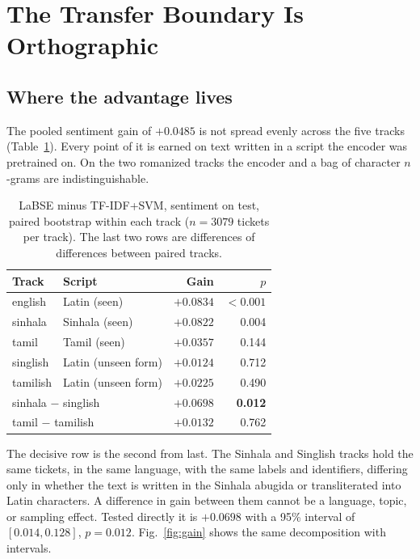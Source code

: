 \section{The Transfer Boundary Is Orthographic}
\label{sec:script}

\subsection{Where the advantage lives}

The pooled sentiment gain of $+0.0485$ is not spread evenly across the five
tracks (Table~\ref{tab:gain}). Every point of it is earned on text written in a
script the encoder was pretrained on. On the two romanized tracks the encoder
and a bag of character $n$-grams are indistinguishable.

\begin{table}[t]
\caption{LaBSE minus TF-IDF+SVM, sentiment \negf{} on test, paired bootstrap
within each track ($n=3079$ tickets per track). The last two rows are
differences of differences between paired tracks.}
\label{tab:gain}
\centering
\small
\begin{tabular}{llrr}
\toprule
Track & Script & Gain & $p$ \\
\midrule
english  & Latin (seen)         & $+0.0834$ & $<0.001$ \\
sinhala  & Sinhala (seen)       & $+0.0822$ & 0.004 \\
tamil    & Tamil (seen)         & $+0.0357$ & 0.144 \\
singlish & Latin (unseen form)  & $+0.0124$ & 0.712 \\
tamilish & Latin (unseen form)  & $+0.0225$ & 0.490 \\
\midrule
\multicolumn{2}{l}{sinhala $-$ singlish} & $\mathbf{+0.0698}$ & \textbf{0.012} \\
\multicolumn{2}{l}{tamil $-$ tamilish}   & $+0.0132$ & 0.762 \\
\bottomrule
\end{tabular}
\end{table}

The decisive row is the second from last. The Sinhala and Singlish tracks hold
the same tickets, in the same language, with the same labels and identifiers,
differing only in whether the text is written in the Sinhala abugida or
transliterated into Latin characters. A difference in gain between them cannot
be a language, topic, or sampling effect. Tested directly it is $+0.0698$ with a
95\% interval of $[0.014, 0.128]$, $p=0.012$. Fig.~\ref{fig:gain} shows the same
decomposition with intervals.

